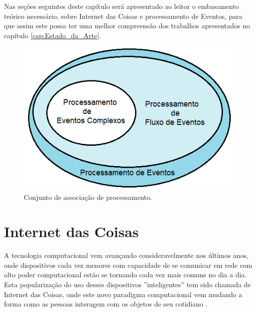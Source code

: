 \documentclass[ti,table]{texufpel} %
\begin{document}
  

Nas seções seguintes deste capítulo será apresentado ao leitor o embasamento teórico necessário, sobre Internet das Coisas e processamento de Eventos, para que assim este possa ter uma melhor compreensão dos trabalhos apresentados no capítulo \ref{cap:Estado_da_Arte}. 

  

  

\begin{figure}[ht] 

    \centering 

    \includegraphics[width=.6\textwidth]{imagens/ConjuntoProcessamento.png} 

    \caption{Conjunto de associação de processamento.} 

    \label{fig:ConjuntoProcessamento} 

\end{figure} 

  

  

\section{Internet das Coisas} 

  

A tecnologia computacional vem avançando consideravelmente nos últimos anos, onde dispositivos cada vez menores com capacidade de se comunicar em rede com alto poder computacional estão se tornando cada vez mais comuns no dia a dia. Esta popularização do uso desses dispositivos ''inteligentes'' tem sido chamada de Internet das Coisas, onde este novo paradigma computacional vem mudando a forma como as pessoas interagem com os objetos de seu cotidiano \cite{xavier2016smart}. 

  
\end{document}
